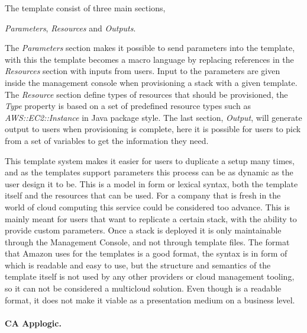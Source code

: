 The template consist of three main sections, 
\begin{ii}
  \iitem \emph{Parameters}, 
  \iitem \emph{Resources} and 
  \iitem \emph{Outputs}.
\end{ii}
The \emph{Parameters} section makes it possible to send parameters into the template, 
with this the template becomes a macro language by replacing 
references in the \emph{Resources} section with inputs from users. 
Input to the parameters are given inside the management console when 
provisioning a stack with a given template.
The \emph{Resource} section define types of resources that should be provisioned, the \emph{Type}
property is based on a set of predefined resource types such as \emph{AWS::EC2::Instance}
in Java package style.
The last section, \emph{Output}, will generate output to users when provisioning is complete,
here it is possible for users to pick from a set of variables to get the information they need.

This template system makes it easier for users to duplicate a setup many times, 
and as the templates support parameters this process can be as dynamic as the user design it to be. 
This is a model in form or lexical syntax, both the template itself 
and the resources that can be used.
For a company that is fresh in the world of cloud computing this service 
could be considered too advance. 
This is mainly meant for users that want to replicate a certain stack, 
with the ability to provide custom parameters. 
Once a stack is deployed it is only maintainable through the  Management Console, 
and not through template files. 
The format that Amazon uses for the templates is a good format, 
the syntax is in form of  which is readable and easy to use, 
but the structure and semantics of the template itself is not used by any 
other providers or cloud management tooling, 
so it can not be considered a multicloud solution. 
Even though  is a readable format, 
it does not make it viable as a presentation medium on a business level.

\paragraph{CA Applogic.}~\cite{applogic}



